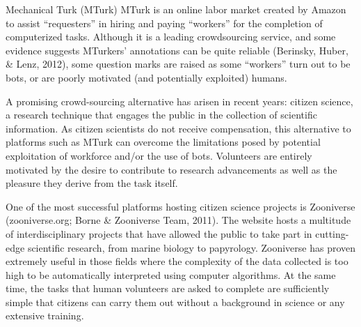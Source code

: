 \documentclass[english,,man]{apa6}
\begin{document}
Mechanical Turk (MTurk) MTurk is an online labor market created by Amazon to assist \enquote{requesters} in hiring and paying \enquote{workers} for the completion of computerized tasks. Although it is a leading crowdsourcing service, and some evidence suggests MTurkers' annotations can be quite reliable (Berinsky, Huber, \& Lenz, 2012), some question marks are raised as some \enquote{workers} turn out to be bots, or are poorly motivated (and potentially exploited) humans.

A promising crowd-sourcing alternative has arisen in recent years: citizen science, a research technique that engages the public in the collection of scientific information. As citizen scientists do not receive compensation, this alternative to platforms such as MTurk can overcome the limitations posed by potential exploitation of workforce and/or the use of bots. Volunteers are entirely motivated by the desire to contribute to research advancements as well as the pleasure they derive from the task itself.

One of the most successful platforms hosting citizen science projects is Zooniverse (zooniverse.org; Borne \& Zooniverse Team, 2011). The website hosts a multitude of interdisciplinary projects that have allowed the public to take part in cutting-edge scientific research, from marine biology to papyrology. Zooniverse has proven extremely useful in those fields where the complexity of the data collected is too high to be automatically interpreted using computer algorithms. At the same time, the tasks that human volunteers are asked to complete are sufficiently simple that citizens can carry them out without a background in science or any extensive training.
\end{document}
